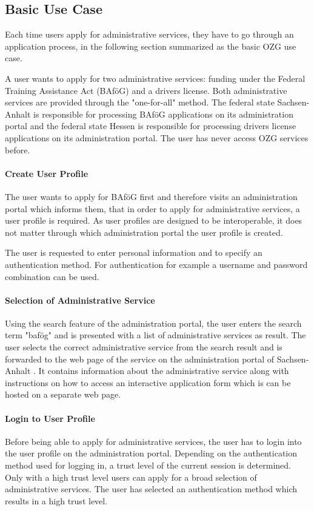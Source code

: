 \subsection{Basic Use Case}
Each time users apply for administrative services, they have to go through an application process, in the following section summarized as the basic OZG use case.

A user wants to apply for two administrative services: funding under the Federal Training Assistance Act (BAföG) and a drivers license. Both administrative services are provided through the "one-for-all" method. The federal state Sachsen-Anhalt is responsible for processing BAföG applications on its administration portal and the federal state Hessen is responsible for processing drivers license applications on its administration portal. The user has never access OZG services before.

\paragraph{Create User Profile} The user wants to apply for BAföG first and therefore visits an administration portal which informs them, that in order to apply for administrative services, a user profile is required. As user profiles are designed to be interoperable, it does not matter through which administration portal the user profile is created.

The user is requested to enter personal information and to specify an authentication method. For authentication for example a username and password combination can be used.

\paragraph{Selection of Administrative Service} Using the search feature of the administration portal, the user enters the search term "bafög" and is presented with a list of administrative services as result. The user selects the correct administrative service from the search result and is forwarded to the web page of the service on the administration portal of Sachsen-Anhalt . It contains information about the administrative service along with instructions on how to access an interactive application form which is can be hosted on a separate web page.

\paragraph{Login to User Profile} Before being able to apply for administrative services, the user has to login into the user profile on the administration portal. Depending on the authentication method used for logging in, a trust level of the current session is determined. Only with a high trust level users can apply for a broad selection of administrative services. The user has selected an authentication method which results in a high trust level.
    
